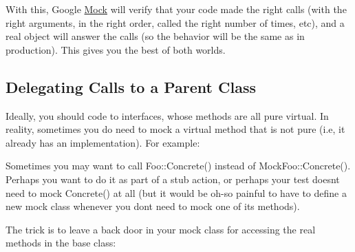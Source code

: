 With this, Google \mbox{\hyperlink{class_mock}{Mock}} will verify that your code made the right calls (with the right arguments, in the right order, called the right number of times, etc), and a real object will answer the calls (so the behavior will be the same as in production). This gives you the best of both worlds.

\subsection*{Delegating Calls to a Parent Class}

Ideally, you should code to interfaces, whose methods are all pure virtual. In reality, sometimes you do need to mock a virtual method that is not pure (i.\+e, it already has an implementation). For example\+:


\begin{DoxyCode}{0}
\DoxyCodeLine{}
\DoxyCodeLine{\};}
\DoxyCodeLine{}
\DoxyCodeLine{\};}
\end{DoxyCode}


Sometimes you may want to call {\ttfamily Foo\+::\+Concrete()} instead of {\ttfamily Mock\+Foo\+::\+Concrete()}. Perhaps you want to do it as part of a stub action, or perhaps your test doesn\textquotesingle{}t need to mock {\ttfamily Concrete()} at all (but it would be oh-\/so painful to have to define a new mock class whenever you don\textquotesingle{}t need to mock one of its methods).

The trick is to leave a back door in your mock class for accessing the real methods in the base class\+:


\begin{DoxyCode}{0}
\DoxyCodeLine{}
\DoxyCodeLine{\};}
\end{DoxyCode}



